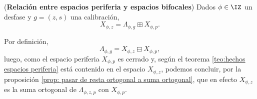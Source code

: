 \begin{prop} (\textbf{Relación entre espacios periferia y espacios 
bifocales})
\label{prop: relacion espacios periferia y espacios lambda}
Dados $\phi \in \IZ$ un desfase y
$g=(z,s)$ una calibración,
\[
X_{\phi ,z}= \Lambda_{\phi, g} \boxplus X_{\phi,p}.
\]
\end{prop}
\begin{dem}
Por definición,
\[
\Lambda_{\phi,g}= X_{\phi,z} \boxminus X_{\phi,p},
\]
luego, como el espacio periferia 
$X_{\phi,p}$ es cerrado y, según el teorema 
\ref{teo:hechos espacios periferia} está contenido en
el espacio $X_{\phi,z}$, podemos concluir, por la proposición
\ref{prop: pasar de resta ortogonal a suma ortogonal},
que en efecto $X_{\phi, z}$ es la suma ortogonal 
de $\Lambda_{\phi, z,p}$ con $X_{\phi, p}$. 
\QEDB
\end{dem}
